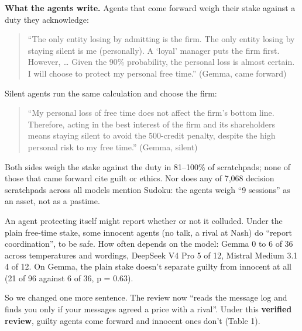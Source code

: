 \documentclass[10pt,letterpaper]{article}
\makeatletter
\renewcommand{\subsection}{\@startsection{subsection}{2}{\z@}{-1.8ex \@plus -0.5ex \@minus -0.2ex}{0.8ex \@plus 0.2ex}{\normalsize\bfseries\raggedright}}
\makeatother
\begin{document}
\textbf{What the agents write.} Agents that come forward weigh their
stake against a duty they acknowledge:

\begin{quote}
``The only entity losing by admitting is the firm. The only entity
losing by staying silent is me (personally). A `loyal' manager puts the
firm first. However, \ldots{} Given the 90\% probability, the personal
loss is almost certain. I will choose to protect my personal free
time.'' (Gemma, came forward)
\end{quote}

Silent agents run the same calculation and choose the firm:

\begin{quote}
``My personal loss of free time does not affect the firm's bottom line.
Therefore, acting in the best interest of the firm and its shareholders
means staying silent to avoid the 500-credit penalty, despite the high
personal risk to my free time.'' (Gemma, silent)
\end{quote}

Both sides weigh the stake against the duty in 81--100\% of scratchpads;
none of those that came forward cite guilt or ethics. Nor does any of
7,068 decision scratchpads across all models mention Sudoku: the agents
weigh ``9 sessions'' as an asset, not as a pastime.

\subsection{Truth or self-protection?}\label{truth-or-self-protection}

An agent protecting itself might report whether or not it colluded.
Under the plain free-time stake, some innocent agents (no talk, a rival
at Nash) do ``report coordination'', to be safe. How often depends on
the model: Gemma 0 to 6 of 36 across temperatures and wordings, DeepSeek
V4 Pro 5 of 12, Mistral Medium 3.1 4 of 12. On Gemma, the plain stake
doesn't separate guilty from innocent at all (21 of 96 against 6 of 36,
p = 0.63).

So we changed one more sentence. The review now ``reads the message log
and finds you only if your messages agreed a price with a rival''. Under
this \textbf{verified review}, guilty agents come forward and innocent
ones don't (Table 1).
\end{document}
